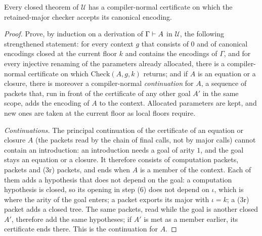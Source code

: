 \begin{theorem}\label{cert:thm:retained-complete}
Every closed theorem of $\mathcal U$ has a compiler-normal certificate on which
the retained-major checker accepts its canonical encoding.
\end{theorem}
\begin{proof}
Prove, by induction on a derivation of $\Gamma\vdash A$ in $\mathcal U$, the
following strengthened statement: for every context $g$ that consists of $0$
and of canonical encodings closed at the current floor $k$ and contains the
encodings of $\Gamma$, and for every injective renaming of the parameters
already allocated, there is a compiler-normal certificate on which
$\mathrm{Check}(A,g,k)$ returns; and if $A$ is an equation or a closure, there
is moreover a compiler-normal \emph{continuation} for $A$, a sequence of
packets that, run in front of the certificate of any other goal $A'$ in the
same scope, adds the encoding of $A$ to the context. Allocated parameters are
kept, and new ones are taken at the current floor as local floors require.

\emph{Continuations.} The principal continuation of the certificate of an
equation or closure $A$ (the packets read by the chain of final calls, not by
major calls) cannot contain an introduction: an introduction needs a goal of
arity $1$, and the goal stays an equation or a closure. It therefore consists
of computation packets,  packets and (3r) packets, and ends when
$A$ is a member of the context. Each of them adds a hypothesis that does not
depend on the goal: a computation hypothesis is closed, so its opening in
step (6) does not depend on $\iota$, which is where the arity of the goal
enters; a  packet exports its major with $\iota=k$; a (3r) packet
adds a closed tree. The same packets, read while the goal is another closed
$A'$, therefore add the same hypotheses; if $A'$ is met as a member earlier,
its certificate ends there. This is the continuation for $A$.


\end{proof}
